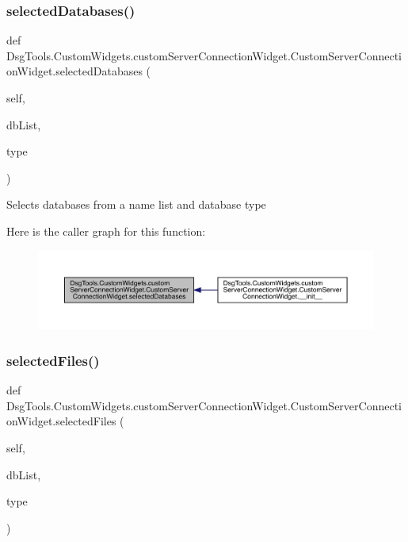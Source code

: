 \subsubsection{\texorpdfstring{selected\+Databases()}{selectedDatabases()}}
{\footnotesize\ttfamily def Dsg\+Tools.\+Custom\+Widgets.\+custom\+Server\+Connection\+Widget.\+Custom\+Server\+Connection\+Widget.\+selected\+Databases (\begin{DoxyParamCaption}\item[{}]{self,  }\item[{}]{db\+List,  }\item[{}]{type }\end{DoxyParamCaption})}

\begin{DoxyVerb}Selects databases from a name list and database type
\end{DoxyVerb}
 Here is the caller graph for this function\+:
\nopagebreak
\begin{figure}[H]
\begin{center}
\leavevmode
\includegraphics[width=350pt]{class_dsg_tools_1_1_custom_widgets_1_1custom_server_connection_widget_1_1_custom_server_connection_widget_a6292041487c522474161338a4394b0fc_icgraph}
\end{center}
\end{figure}
\mbox{\label{class_dsg_tools_1_1_custom_widgets_1_1custom_server_connection_widget_1_1_custom_server_connection_widget_aac7156461aa00347401631dd83460aa6}} 
\subsubsection{\texorpdfstring{selected\+Files()}{selectedFiles()}}
{\footnotesize\ttfamily def Dsg\+Tools.\+Custom\+Widgets.\+custom\+Server\+Connection\+Widget.\+Custom\+Server\+Connection\+Widget.\+selected\+Files (\begin{DoxyParamCaption}\item[{}]{self,  }\item[{}]{db\+List,  }\item[{}]{type }\end{DoxyParamCaption})}

